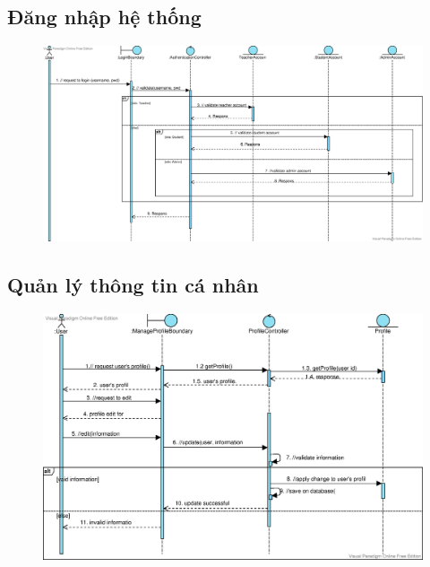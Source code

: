 \documentclass[./../main_file.tex]{subfiles}
\begin{document}
	



	\subsection{Đăng nhập hệ thống }
	\begin{figure}[H]
		\centering
		\includegraphics[width=\linewidth]{./images/sequence_diagram/3_1_Login.eps}
	\end{figure}

	\subsection{Quản lý thông tin cá nhân  }
	\begin{figure}[H]
		\centering
		\includegraphics[width=\linewidth]{./images/sequence_diagram/3_2_ProfileManagement.eps}
	\end{figure}
	
\end{document}
